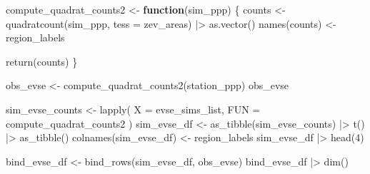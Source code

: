 \documentclass[
  letterpaper,
  DIV=11,
  numbers=noendperiod]{scrartcl}
\newenvironment{Shaded}{\begin{snugshade}}{\end{snugshade}}
\newcommand{\AttributeTok}[1]{\textcolor[rgb]{0.40,0.45,0.13}{#1}}
\newcommand{\ControlFlowTok}[1]{\textcolor[rgb]{0.00,0.23,0.31}{\textbf{#1}}}
\newcommand{\DecValTok}[1]{\textcolor[rgb]{0.68,0.00,0.00}{#1}}
\newcommand{\FunctionTok}[1]{\textcolor[rgb]{0.28,0.35,0.67}{#1}}
\newcommand{\NormalTok}[1]{\textcolor[rgb]{0.00,0.23,0.31}{#1}}
\newcommand{\OtherTok}[1]{\textcolor[rgb]{0.00,0.23,0.31}{#1}}
\newcommand{\SpecialCharTok}[1]{\textcolor[rgb]{0.37,0.37,0.37}{#1}}
\begin{document}
\begin{tcolorbox}[enhanced jigsaw, colframe=quarto-callout-note-color-frame, toprule=.15mm, arc=.35mm, breakable, leftrule=.75mm, bottomrule=.15mm, colback=white, rightrule=.15mm, left=2mm, opacityback=0]
\begin{minipage}[t]{\textwidth - 5.5mm}
\begin{Shaded}
\begin{Highlighting}[]
\NormalTok{compute\_quadrat\_counts2 }\OtherTok{\textless{}{-}} \ControlFlowTok{function}\NormalTok{(sim\_ppp) \{}
\NormalTok{  counts }\OtherTok{\textless{}{-}} \FunctionTok{quadratcount}\NormalTok{(sim\_ppp, }\AttributeTok{tess =}\NormalTok{ zev\_areas) }\SpecialCharTok{|\textgreater{}} \FunctionTok{as.vector}\NormalTok{()}
  \FunctionTok{names}\NormalTok{(counts) }\OtherTok{\textless{}{-}}\NormalTok{ region\_labels}

  \FunctionTok{return}\NormalTok{(counts)}
\NormalTok{\}}
\end{Highlighting}
\end{Shaded}

\begin{Shaded}
\begin{Highlighting}[]
\NormalTok{obs\_evse }\OtherTok{\textless{}{-}} \FunctionTok{compute\_quadrat\_counts2}\NormalTok{(station\_ppp)}
\NormalTok{obs\_evse}
\end{Highlighting}
\end{Shaded}

\begin{Shaded}
\begin{Highlighting}[]
\NormalTok{sim\_evse\_counts }\OtherTok{\textless{}{-}} \FunctionTok{lapply}\NormalTok{(}
  \AttributeTok{X =}\NormalTok{ evse\_sims\_list,}
  \AttributeTok{FUN =}\NormalTok{ compute\_quadrat\_counts2}
\NormalTok{)}
\NormalTok{sim\_evse\_df }\OtherTok{\textless{}{-}} \FunctionTok{as\_tibble}\NormalTok{(sim\_evse\_counts) }\SpecialCharTok{|\textgreater{}} \FunctionTok{t}\NormalTok{() }\SpecialCharTok{|\textgreater{}} \FunctionTok{as\_tibble}\NormalTok{()}
\FunctionTok{colnames}\NormalTok{(sim\_evse\_df) }\OtherTok{\textless{}{-}}\NormalTok{ region\_labels}
\NormalTok{sim\_evse\_df }\SpecialCharTok{|\textgreater{}} \FunctionTok{head}\NormalTok{(}\DecValTok{4}\NormalTok{)}
\end{Highlighting}
\end{Shaded}

\begin{Shaded}
\begin{Highlighting}[]
\NormalTok{bind\_evse\_df }\OtherTok{\textless{}{-}} \FunctionTok{bind\_rows}\NormalTok{(sim\_evse\_df, obs\_evse)}
\NormalTok{bind\_evse\_df }\SpecialCharTok{|\textgreater{}} \FunctionTok{dim}\NormalTok{()}
\end{Highlighting}
\end{Shaded}


\end{minipage}
\end{tcolorbox}
\end{document}
